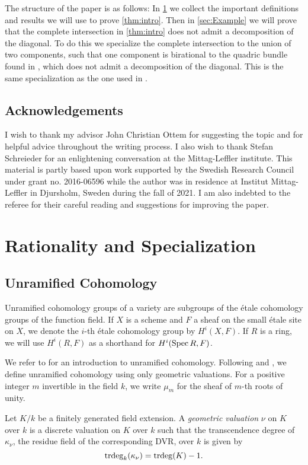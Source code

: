 The structure of the paper is as follows: In \cref{sec:Prelim} we collect the important definitions and results we will use to prove \cref{thm:intro}. Then in \cref{sec:Example} we will prove that the complete intersection in \cref{thm:intro} does not admit a decomposition of the diagonal. To do this we specialize the complete intersection to the union of two components, such that one component is birational to the quadric bundle found in \cite{HPTActa}, which does not admit a decomposition of the diagonal. This is the same specialization as the one used in \cite{NicaiseOttem}.

\subsection{Acknowledgements}
I wish to thank my advisor John Christian Ottem for suggesting the topic and for helpful advice throughout the writing process. I also wish to thank Stefan Schreieder for an enlightening conversation at the Mittag-Leffler institute. This material is partly based upon work supported by the Swedish Research Council under grant no. 2016-06596 while the author was in residence at Institut Mittag-Leffler in Djursholm, Sweden during the fall of 2021. I am also indebted to the referee for their careful reading and suggestions for improving the paper.

\section{Rationality and Specialization}
\label{sec:Prelim}
\subsection{Unramified Cohomology}
Unramified cohomology groups of a variety are subgroups of the \'etale cohomology groups of the function field. If $X$ is a scheme and $F$ a sheaf on the small \'etale site on $X$, we denote the $i$-th \'etale cohomology group by $H^i(X,F)$. If $R$ is a ring, we will use $H^i(R,F)$ as a shorthand for $H^i(\operatorname{Spec} R,F)$.

We refer to \cite{SchreiederCyclesAndRationality} for an introduction to unramified cohomology. Following \cite{SchreiederCyclesAndRationality} and \cite{Mer08}, we define unramified cohomology using only geometric valuations. For a positive integer $m$ invertible in the field $k$, we write $\mu_m$ for the sheaf of $m$-th roots of unity.


\begin{definition}{{\cite[Definition 4.1]{SchreiederCyclesAndRationality}}}
	Let $K/k$ be a finitely generated field extension. A \emph{geometric valuation} $\nu$ on $K$ over $k$ is a discrete valuation on $K$ over $k$ such that the transcendence degree of $\kappa_\nu$, the residue field of the corresponding DVR, over $k$ is given by
	\[\operatorname{trdeg}_k(\kappa_\nu) = \operatorname{trdeg}(K)-1.\]
\end{definition}

